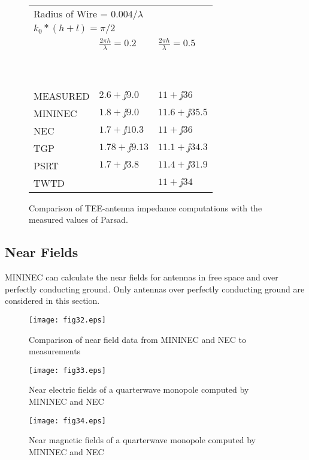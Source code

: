 \documentclass[12pt]{article}
\begin{document}
\clearpage

\begin{figure}[htb]
\begin{tabular}{lll}
\multicolumn{2}{l}{\quad Radius of Wire = $0.004/\lambda$}  \\
\multicolumn{2}{l}{\quad $k_0 * (h + l) = \pi/2$}           \\
         & $\frac{2\pi h}{\lambda}=0.2$ & $\frac{2\pi h}{\lambda}=0.5$ \\
\ \\
\hline
\ \\
MEASURED & $2.6+\jj9.0$                 & $11+\jj36$      \\
MININEC  & $1.8+\jj9.0$                 & $11.6+\jj35.5$  \\
NEC      & $1.7+\jj10.3$                & $11+\jj36$      \\
TGP      & $1.78+\jj9.13$               & $11.1+\jj34.3$  \\
PSRT     & $1.7+\jj3.8$                 & $11.4+\jj31.9$  \\
TWTD     &                              & $11+\jj34$      \\
\end{tabular}
\caption{Comparison of TEE-antenna impedance computations with the
measured values of Parsad.}
\label{fig31}
\end{figure}

\subsection{Near Fields}
MININEC can calculate the near fields for antennas in free space and
over perfectly conducting ground. Only antennas over perfectly
conducting ground are considered in this section.

\begin{figure}[htb]
\centerline{\texttt{[image: fig32.eps]}}
\caption{Comparison of near field data from MININEC and NEC to measurements}
\label{fig32}
\end{figure}

\begin{figure}[htb]
\centerline{\texttt{[image: fig33.eps]}}
\caption{Near electric fields of a quarterwave monopole computed by
MININEC and NEC}
\label{fig33}
\end{figure}

\begin{figure}[htb]
\centerline{\texttt{[image: fig34.eps]}}
\caption{Near magnetic fields of a quarterwave monopole computed by
MININEC and NEC}
\label{fig34}
\end{figure}
\end{document}
